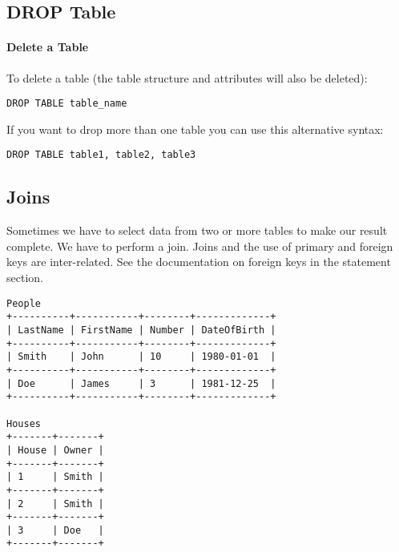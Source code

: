 \documentclass{howto}
\begin{document}
\subsection{DROP Table}%

\paragraph{Delete a Table}

To delete a table (the table structure and attributes will also be deleted): %

\begin{verbatim}
DROP TABLE table_name
\end{verbatim}


If you want to drop more than one table you can use this alternative syntax:

\begin{verbatim}
DROP TABLE table1, table2, table3
\end{verbatim}





\subsection{Joins}

Sometimes we have to select data from two or more tables to make our result complete. We have to perform a join. Joins and the use of primary and foreign keys are inter-related. See the documentation on foreign keys in the  statement section.

\begin{verbatim}
People
+----------+-----------+--------+-------------+
| LastName | FirstName | Number | DateOfBirth |
+----------+-----------+--------+-------------+
| Smith    | John      | 10     | 1980-01-01  |
+----------+-----------+--------+-------------+
| Doe      | James     | 3      | 1981-12-25  |
+----------+-----------+--------+-------------+

Houses
+-------+-------+
| House | Owner |
+-------+-------+
| 1     | Smith |
+-------+-------+
| 2     | Smith |
+-------+-------+
| 3     | Doe   |
+-------+-------+
\end{verbatim}
\end{document}
